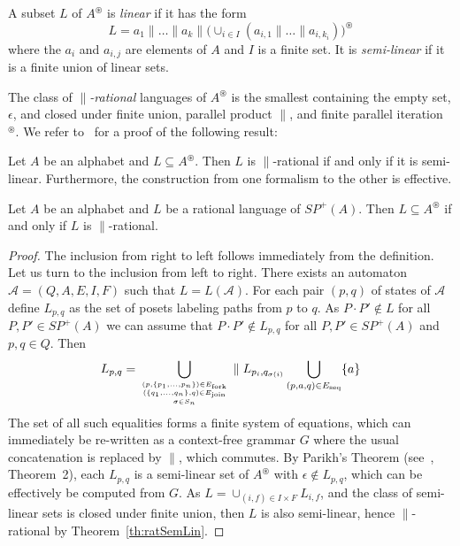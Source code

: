 \documentclass{CSML}
\begin{document}
A subset $L$ of $A^\circledast$ is \emph{linear} if it has the form $$L=a_1\parallel\dots\parallel a_k\parallel\bigl(\cup_{i\in I}(a_{i,1}\parallel\dots\parallel a_{i,k_i})\bigr)^\circledast$$ where the $a_i$ and $a_{i,j}$ are elements of $A$ and $I$ is a finite set. It is \emph{semi-linear} if it is a finite union of linear sets.

The class of \emph{$\parallel$-rational} languages of $A^\circledast$ is the smallest containing the empty set, $\epsilon$, and closed under finite union, parallel product $\parallel$, and finite parallel iteration $^\circledast$. 
We refer to~\cite{EilSch69} for a proof of the following result:
\begin{thm}
  \label{th:ratSemLin}
  Let $A$ be an alphabet and $L\subseteq A^\circledast$. Then $L$ is $\parallel$-rational if and only if it is semi-linear. Furthermore, the construction from one formalism to the other is effective.
\end{thm}

\begin{prop}
  \label{prop:parallelRational}
  Let $A$ be an alphabet and $L$ be a rational language of $SP^+(A)$.
  Then $L\subseteq A^\circledast$ if and only if $L$ is $\parallel$-rational.
\end{prop}

\begin{proof}
  The inclusion from right to left follows immediately from the definition.
  Let us turn to the inclusion from left to right. There exists an automaton $\mathcal{A}=(Q,A,E,I,F)$ such that $L=L(\mathcal{A})$. For each pair $(p,q)$ of states of $\mathcal{A}$ define $L_{p,q}$ as the set of posets labeling paths from $p$ to $q$. As $P\cdot P'\not\in L$ for all $P,P'\in SP^+(A)$ we can assume that $P\cdot P'\not\in L_{p,q}$ for all $P,P'\in SP^+(A)$ and $p,q\in Q$. Then 
$$L_{p,q}=\mathop\bigcup_{{(p,\{p_1,\dots,p_n\})\in E_\text{fork}\atop (\{q_1,\dots,q_n\},q)\in E_\text{join}}\atop \sigma\in S_n} \parallel L_{p_i,q_{\sigma(i)}}\mathop\bigcup_{(p,a,q)\in E_\text{seq}} \{a\}$$
The set of all such equalities forms a finite system of equations, which can immediately be re-written as a context-free grammar $G$ where the usual concatenation is replaced by $\parallel$, which commutes. By Parikh's Theorem (see~\cite{Parikh:1966:CL:321356.321364}, Theorem~2), each $L_{p,q}$ is a semi-linear set of $A^\circledast$ with $\epsilon\not\in L_{p,q}$, which can be effectively be computed from $G$. As $L=\cup_{(i,f)\in I\times F}L_{i,f}$, and the class of semi-linear sets is closed under finite union, then $L$ is also semi-linear, hence $\parallel$-rational by Theorem~\ref{th:ratSemLin}. 
\end{proof}
\end{document}
